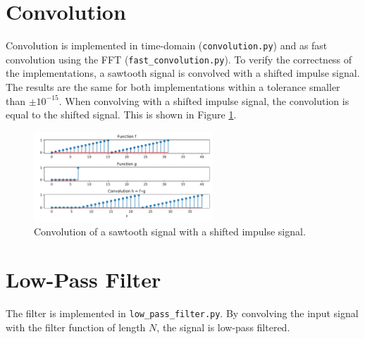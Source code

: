 \documentclass[12pt, a4paper]{report}
\begin{document}
\section{Convolution}
Convolution is implemented in time-domain (\texttt{convolution.py})
and as fast convolution using the \ac{FFT} (\texttt{fast\_convolution.py}).
To verify the correctness of the implementations,
a sawtooth signal is convolved with a shifted impulse signal.
The results are the same for both implementations within a tolerance smaller than \(\pm10^{-15}\).
When convolving with a shifted impulse signal, the convolution is equal to the shifted signal.
This is shown in Figure \ref{fig:convolution}.
\begin{figure}[h!]
	\centering
	\includegraphics[width=0.6\textwidth]{figures/convolution.pdf}
	\caption{Convolution of a sawtooth signal with a shifted impulse signal.}
	\label{fig:convolution}
\end{figure}

\section{Low-Pass Filter}

The filter is implemented in \texttt{low\_pass\_filter.py}.
By convolving the input signal with the filter function of length \(N\),
the signal is low-pass filtered.
\end{document}

